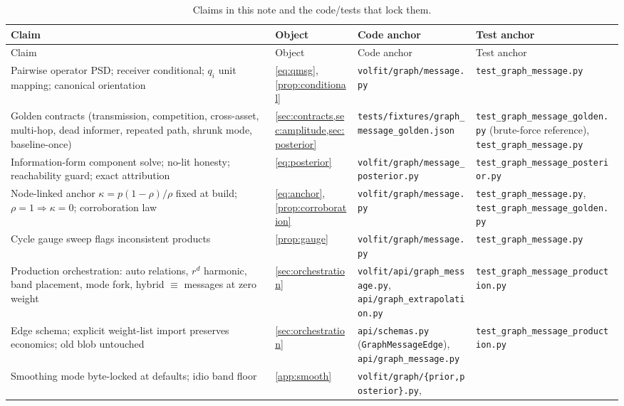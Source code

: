 \documentclass[11pt]{article}
\begin{document}
\begingroup
\small
\setlength{\tabcolsep}{3pt}
\begin{longtable}{@{}p{}p{}p{}p{}@{}}
\caption{Claims in this note and the code/tests that lock them.}\\
\toprule Claim & Object & Code anchor & Test anchor\\ \midrule
\endfirsthead
\toprule Claim & Object & Code anchor & Test anchor\\ \midrule
\endhead
Pairwise operator PSD; receiver conditional; $q_i$ unit mapping;
canonical orientation &
\eqref{eq:qmsg}, \cref{prop:conditional} &
\nolinkurl{volfit/graph/message.py} &
\nolinkurl{test_graph_message.py}\\
Golden contracts (transmission, competition, cross-asset, multi-hop,
dead informer, repeated path, shrunk mode, baseline-once) &
\cref{sec:contracts,sec:amplitude,sec:posterior} &
\nolinkurl{tests/fixtures/graph_message_golden.json} &
\nolinkurl{test_graph_message_golden.py} (brute-force reference),
\nolinkurl{test_graph_message.py}\\
Information-form component solve; no-lit honesty; reachability guard;
exact attribution &
\eqref{eq:posterior} &
\nolinkurl{volfit/graph/message_posterior.py} &
\nolinkurl{test_graph_message_posterior.py}\\
Node-linked anchor $\kappa=p(1-\rho)/\rho$ fixed at build;
$\rho=1\Rightarrow\kappa=0$; corroboration law &
\eqref{eq:anchor}, \cref{prop:corroboration} &
\nolinkurl{volfit/graph/message.py} &
\nolinkurl{test_graph_message.py},
\nolinkurl{test_graph_message_golden.py}\\
Cycle gauge sweep flags inconsistent products &
\cref{prop:gauge} &
\nolinkurl{volfit/graph/message.py} &
\nolinkurl{test_graph_message.py}\\
Production orchestration: auto relations, $r^d$ harmonic, band
placement, mode fork, hybrid $\equiv$ messages at zero weight &
\cref{sec:orchestration} &
\nolinkurl{volfit/api/graph_message.py},
\nolinkurl{api/graph_extrapolation.py} &
\nolinkurl{test_graph_message_production.py}\\
Edge schema; explicit weight-list import preserves economics; old blob
untouched &
\cref{sec:orchestration} &
\nolinkurl{api/schemas.py} (\texttt{GraphMessageEdge}),
\nolinkurl{api/graph_message.py} &
\nolinkurl{test_graph_message_production.py}\\
Smoothing mode byte-locked at defaults; idio band floor &
\cref{app:smooth} &
\nolinkurl{volfit/graph/\{prior,posterior\}.py},

\end{longtable}
\end{document}
